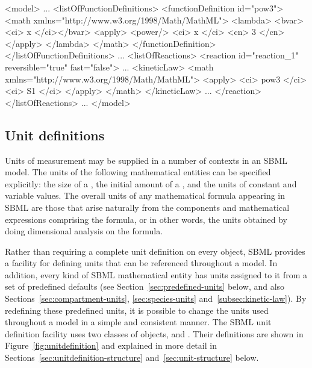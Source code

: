 \begin{example}
<model>
    ...
    <listOfFunctionDefinitions>
        <functionDefinition id="pow3">
            <math xmlns="http://www.w3.org/1998/Math/MathML">
                <lambda>
                    <bvar><ci> x </ci></bvar>
                    <apply>
                        <power/>
                        <ci> x </ci>
                        <cn> 3 </cn>
                    </apply>
                </lambda>
            </math>
        </functionDefinition>
    </listOfFunctionDefinitions>
    ...
    <listOfReactions>
        <reaction id="reaction_1" reversible="true" fast="false">
            ...
            <kineticLaw>
                <math xmlns="http://www.w3.org/1998/Math/MathML">
                    <apply>
                        <ci> pow3 </ci>
                        <ci> S1 </ci>
                     </apply>
                </math>
            </kineticLaw>
            ...
        </reaction>
    </listOfReactions>
    ...
</model>\end{example}


\subsection{Unit definitions}
\label{sec:unitdefinitions}

Units of measurement may be supplied in a number of contexts in an
SBML model.  The units of the following
  mathematical entities can be specified explicitly: the size of a
  \Compartment, the initial amount of a \Species, and
  the units of constant and variable \Parameter values.  The
  overall units of any mathematical formula appearing in
  SBML are those that arise naturally from the components and
  mathematical expressions comprising the formula, or in
  other words, the units obtained by doing dimensional analysis on
  the formula.

Rather than requiring a complete unit definition on every
object, SBML provides a facility for defining units that can be
referenced throughout a model.  In addition, every kind of SBML
mathematical entity has units assigned to it from a set of
predefined defaults (see Section~\ref{sec:predefined-units} below, and
also Sections~\ref{sec:compartment-units}, \ref{sec:species-units}
and~\ref{subsec:kinetic-law}).  By redefining these predefined
units, it is possible to change the units used throughout
a model in a simple and consistent manner.  The SBML unit
definition facility uses two classes of objects, \UnitDefinition
and \Unit.  Their definitions are shown in
Figure~\vref{fig:unitdefinition} and explained in more detail in
Sections~\ref{sec:unitdefinition-structure}
and~\ref{sec:unit-structure} below.

